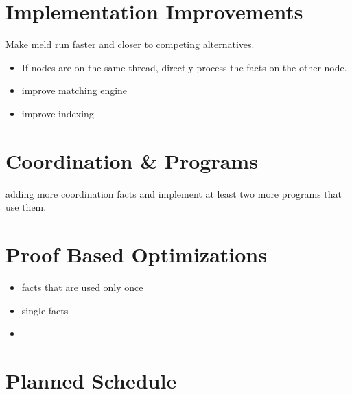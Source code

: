 
\section{Implementation Improvements}

Make meld run faster and closer to competing alternatives.

\begin{itemize}
   \item If nodes are on the same thread, directly process the facts on the other node.
   \item improve matching engine
   \item improve indexing
\end{itemize}

\section{Coordination \& Programs}

adding more coordination facts and implement at least two more programs that use them.

\section{Proof Based Optimizations}

\begin{itemize}
   \item facts that are used only once
   \item single facts
   \item 
\end{itemize}

\section{Planned Schedule}